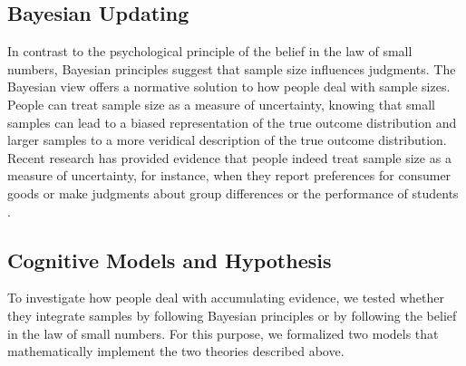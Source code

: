 \documentclass[a4paper,man, natbib]{apa6} %
\begin{document}
\subsection{Bayesian Updating}
In contrast to the psychological principle of the belief in the law of small numbers, Bayesian principles suggest that sample size influences judgments. %
The Bayesian view offers a normative solution to how people deal with sample sizes. People can treat sample size as a measure of uncertainty, knowing that small samples can lead to a biased representation of the true outcome distribution and larger samples to a more veridical description of the true outcome distribution. Recent research has provided evidence that people indeed treat sample size as a measure of uncertainty, for instance, when they report preferences for consumer goods \citep{DeMartino2017} or make judgments about group differences \citep{Obrecht2010} or the performance of students \citep{Fiedler2002}.

\subsection{Cognitive Models and Hypothesis}
To investigate how people deal with accumulating evidence, we tested whether they integrate samples by following Bayesian principles or by following the belief in the law of small numbers. For this purpose, we formalized two models that mathematically implement the two theories described above. 

\end{document}
